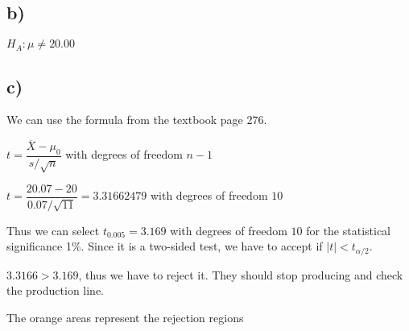 \documentclass[12pt]{article}
\begin{document}
\subsection*{b)}
    \begin{center}
        $H_A: \mu \neq 20.00$
    \end{center}
  
\subsection*{c)}
    We can use the formula from the textbook page 276.
    
    \begin{center}
        $t = \dfrac{\overline{X} - \mu_0}{s / \sqrt{n}}$ with degrees of freedom $n-1$
    \end{center}
    
    \begin{center}
        $t = \dfrac{20.07 - 20}{0.07 / \sqrt{11}} = 3.31662479$ with degrees of freedom $10$
    \end{center}
    
    Thus we can select $t_{0.005} = 3.169$ with degrees of freedom $10$ for the statistical significance 1\%. Since it is a two-sided test, we have to accept if $|t| < t_{\alpha / 2}$.
    
    $3.3166 > 3.169$, thus we have to reject it. They should stop producing and check the production line.
    
    \begin{center}
    \end{center}
    
    \begin{center}
        The orange areas represent the rejection regions
    \end{center}
    
\end{document}
